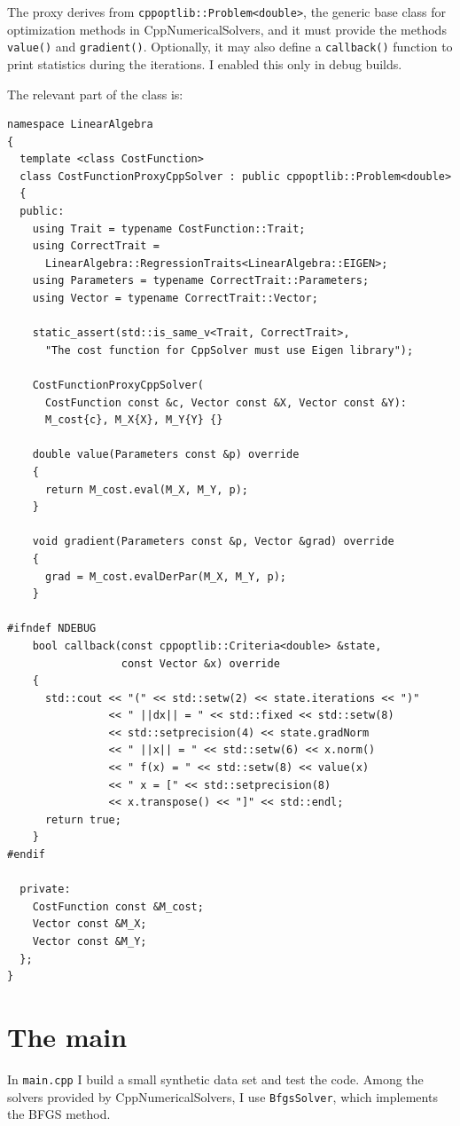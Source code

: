 \documentclass{article}
\newcommand{\li}{\lstinline}
\begin{document}
The proxy derives from \li!cppoptlib::Problem<double>!, the generic base class for optimization methods in CppNumericalSolvers, and it must provide the methods \li!value()! and \li!gradient()!. Optionally, it may also define a \li!callback()! function to print statistics during the iterations. I enabled this only in debug builds.

The relevant part of the class is:
\begin{lstlisting}[title={CostFunctionProxyCppNumSolver.hpp}]
namespace LinearAlgebra
{
  template <class CostFunction>
  class CostFunctionProxyCppSolver : public cppoptlib::Problem<double>
  {
  public:
    using Trait = typename CostFunction::Trait;
    using CorrectTrait =
      LinearAlgebra::RegressionTraits<LinearAlgebra::EIGEN>;
    using Parameters = typename CorrectTrait::Parameters;
    using Vector = typename CorrectTrait::Vector;

    static_assert(std::is_same_v<Trait, CorrectTrait>,
      "The cost function for CppSolver must use Eigen library");

    CostFunctionProxyCppSolver(
      CostFunction const &c, Vector const &X, Vector const &Y):
      M_cost{c}, M_X{X}, M_Y{Y} {}

    double value(Parameters const &p) override
    {
      return M_cost.eval(M_X, M_Y, p);
    }

    void gradient(Parameters const &p, Vector &grad) override
    {
      grad = M_cost.evalDerPar(M_X, M_Y, p);
    }

#ifndef NDEBUG
    bool callback(const cppoptlib::Criteria<double> &state,
                  const Vector &x) override
    {
      std::cout << "(" << std::setw(2) << state.iterations << ")"
                << " ||dx|| = " << std::fixed << std::setw(8)
                << std::setprecision(4) << state.gradNorm
                << " ||x|| = " << std::setw(6) << x.norm()
                << " f(x) = " << std::setw(8) << value(x)
                << " x = [" << std::setprecision(8)
                << x.transpose() << "]" << std::endl;
      return true;
    }
#endif

  private:
    CostFunction const &M_cost;
    Vector const &M_X;
    Vector const &M_Y;
  };
}
\end{lstlisting}

\section{The main}
In \texttt{main.cpp} I build a small synthetic data set and test the code. Among the solvers provided by CppNumericalSolvers, I use \li!BfgsSolver!, which implements the BFGS method.
\end{document}
